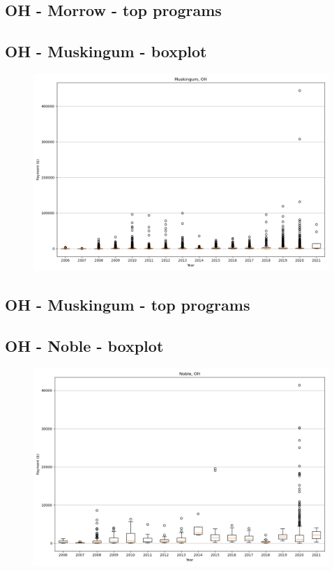 \subsection*{OH - Morrow - top programs}

\newpage
\subsection*{OH - Muskingum - boxplot}
\begin{figure}[h]
\centering
\includegraphics[width=7in]{../output/boxplots/counties/Muskingum-OH_boxplot.png}
\end{figure}


\subsection*{OH - Muskingum - top programs}

\newpage
\subsection*{OH - Noble - boxplot}
\begin{figure}[h]
\centering
\includegraphics[width=7in]{../output/boxplots/counties/Noble-OH_boxplot.png}
\end{figure}


